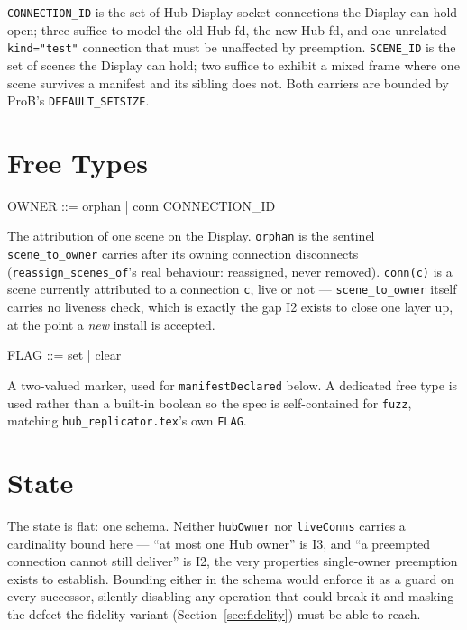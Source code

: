 \documentclass[a4paper,10pt,fleqn]{article}
\begin{document}
\begin{zed}
\end{zed}

\texttt{CONNECTION\_ID} is the set of Hub-Display socket connections the
Display can hold open; three suffice to model the old Hub fd, the new Hub
fd, and one unrelated \texttt{kind="test"} connection that must be
unaffected by preemption.  \texttt{SCENE\_ID} is the set of scenes the
Display can hold; two suffice to exhibit a mixed frame where one scene
survives a manifest and its sibling does not.  Both carriers are bounded
by ProB's \texttt{DEFAULT\_SETSIZE}.

\section{Free Types}

\begin{zed}
  OWNER ::= orphan | conn \ldata CONNECTION\_ID \rdata
\end{zed}

The attribution of one scene on the Display.  \texttt{orphan} is the
sentinel \texttt{scene\_to\_owner} carries after its owning connection
disconnects (\texttt{reassign\_scenes\_of}'s real behaviour: reassigned,
never removed).  \texttt{conn(c)} is a scene currently attributed to a
connection \texttt{c}, live or not --- \texttt{scene\_to\_owner} itself
carries no liveness check, which is exactly the gap I2 exists to close one
layer up, at the point a \emph{new} install is accepted.

\begin{zed}
  FLAG ::= set | clear
\end{zed}

A two-valued marker, used for \texttt{manifestDeclared} below.  A
dedicated free type is used rather than a built-in boolean so the spec is
self-contained for \texttt{fuzz}, matching \texttt{hub\_replicator.tex}'s
own \texttt{FLAG}.

\section{State}

The state is flat: one schema.  Neither \texttt{hubOwner} nor
\texttt{liveConns} carries a cardinality bound here --- ``at most one Hub
owner'' is I3, and ``a preempted connection cannot still deliver'' is I2,
the very properties single-owner preemption exists to establish.  Bounding
either in the schema would enforce it as a guard on every successor,
silently disabling any operation that could break it and masking the
defect the fidelity variant (Section~\ref{sec:fidelity}) must be able to
reach.
\end{document}
